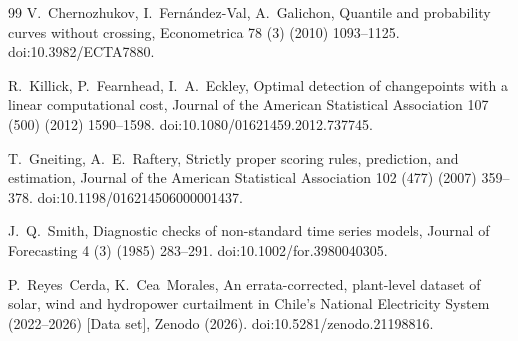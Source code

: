 \documentclass[preprint,3p,times]{elsarticle}
\begin{document}
\begin{thebibliography}{99}
V.~Chernozhukov, I.~Fern\'andez-Val, A.~Galichon,
Quantile and probability curves without crossing,
Econometrica 78 (3) (2010) 1093--1125.
doi:10.3982/ECTA7880.

R.~Killick, P.~Fearnhead, I.~A.~Eckley,
Optimal detection of changepoints with a linear computational cost,
Journal of the American Statistical Association 107 (500) (2012) 1590--1598.
doi:10.1080/01621459.2012.737745.

T.~Gneiting, A.~E.~Raftery,
Strictly proper scoring rules, prediction, and estimation,
Journal of the American Statistical Association 102 (477) (2007) 359--378.
doi:10.1198/016214506000001437.

J.~Q.~Smith,
Diagnostic checks of non-standard time series models,
Journal of Forecasting 4 (3) (1985) 283--291.
doi:10.1002/for.3980040305.

P.~Reyes~Cerda, K.~Cea~Morales,
An errata-corrected, plant-level dataset of solar, wind and hydropower curtailment in Chile's National Electricity System (2022--2026) [Data set],
Zenodo (2026). doi:10.5281/zenodo.21198816.

\end{thebibliography}
\end{document}
